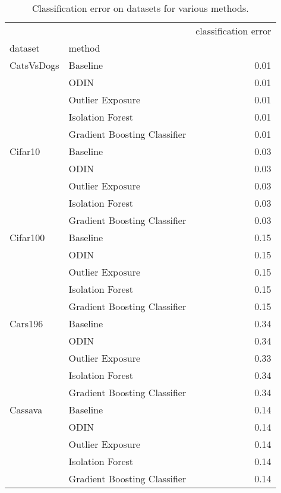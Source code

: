 \begin{table}
\centering
\caption{Classification error on datasets for various methods.}
\label{aggCLFResult}
\begin{tabular}{llr}
\toprule
        &                              &  classification error \\
dataset & method &                       \\
\midrule
CatsVsDogs & Baseline &                  0.01 \\
        & ODIN &                  0.01 \\
        & Outlier Exposure &                  0.01 \\
        & Isolation Forest &                  0.01 \\
        & Gradient Boosting Classifier &                  0.01 \\
Cifar10 & Baseline &                  0.03 \\
        & ODIN &                  0.03 \\
        & Outlier Exposure &                  0.03 \\
        & Isolation Forest &                  0.03 \\
        & Gradient Boosting Classifier &                  0.03 \\
Cifar100 & Baseline &                  0.15 \\
        & ODIN &                  0.15 \\
        & Outlier Exposure &                  0.15 \\
        & Isolation Forest &                  0.15 \\
        & Gradient Boosting Classifier &                  0.15 \\
Cars196 & Baseline &                  0.34 \\
        & ODIN &                  0.34 \\
        & Outlier Exposure &                  0.33 \\
        & Isolation Forest &                  0.34 \\
        & Gradient Boosting Classifier &                  0.34 \\
Cassava & Baseline &                  0.14 \\
        & ODIN &                  0.14 \\
        & Outlier Exposure &                  0.14 \\
        & Isolation Forest &                  0.14 \\
        & Gradient Boosting Classifier &                  0.14 \\
\bottomrule
\end{tabular}
\end{table}
